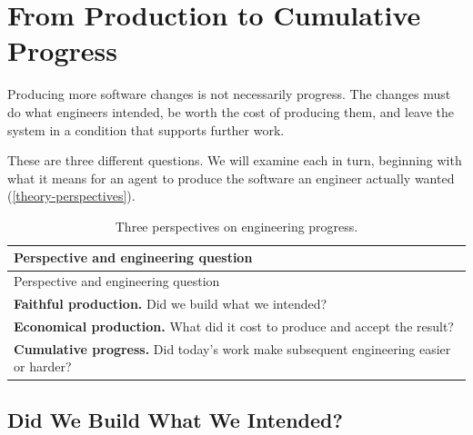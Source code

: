 


\chapter{From Production to Cumulative Progress}



Producing more software changes is not necessarily progress. The changes must do what engineers intended, be worth the cost of producing them, and leave the system in a condition that supports further work.

These are three different questions. We will examine each in turn, beginning with what it means for an agent to produce the software an engineer actually wanted (\autoref{theory-perspectives}).

{\footnotesize
\begin{longtable}[]{@{}p{\linewidth}@{}}
\caption[Three perspectives on engineering progress]{Three perspectives on engineering progress.}\label{theory-perspectives}\tabularnewline
\toprule\noalign{}
Perspective and engineering question \\
\midrule\noalign{}
\endfirsthead
\toprule\noalign{}
Perspective and engineering question \\
\midrule\noalign{}
\endhead
\bottomrule\noalign{}
\endlastfoot
\textbf{Faithful production.} Did we build what we intended? \\
\textbf{Economical production.} What did it cost to produce and accept the result? \\
\textbf{Cumulative progress.} Did today's work make subsequent engineering easier or harder? \\
\end{longtable}
}


\section{Did We Build What We Intended?}\label{heading:encoding-and-realization}

